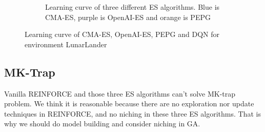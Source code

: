 \documentclass[a4paper]{article}
\begin{document}
\begin{figure}[H]
\begin{subfigure}{.3\textwidth}
	\caption{Learning curve of three different ES algorithms. Blue is CMA-ES, purple is OpenAI-ES and orange is PEPG}
	\label{fig:learning-curve-es-lunarlander}
\end{subfigure}
\caption{Learning curve of CMA-ES, OpenAI-ES, PEPG and DQN for environment LunarLander}
\label{fig:learning-curve-cma-es-dqn-compare-lunarlander}
\end{figure}

\subsection*{MK-Trap}

Vanilla REINFORCE and those three ES algorithms can't solve MK-trap problem. We think it is reasonable because there are no exploration nor update techniques in REINFORCE, and no niching in these three ES algorithms. That is why we should do model building and consider niching in GA.
\end{document}
